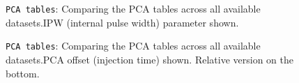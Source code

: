 \documentclass[12pt]{article}
\begin{document}
\begin{figure}
\centering
\noindent{}
  \caption{\centering \texttt{PCA tables}: Comparing the PCA tables across all available datasets.\hspace{\textwidth}IPW (internal pulse width) parameter shown.}
  \label{fig:min5}
\end{figure}

\begin{figure}
\centering
\noindent{}
  \caption{\centering \texttt{PCA tables}: Comparing the PCA tables across all available datasets.\hspace{\textwidth}PCA offset (injection time) shown. Relative version on the bottom.}
  \label{fig:min6}
\end{figure}
\end{document}
